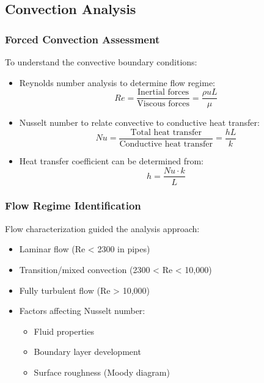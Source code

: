 \subsection*{Convection Analysis}

\subsubsection*{Forced Convection Assessment}

To understand the convective boundary conditions:
\begin{itemize}
    \item Reynolds number analysis to determine flow regime:
    \[
    Re = \frac{\text{Inertial forces}}{\text{Viscous forces}} = \frac{\rho u L}{\mu}
    \]
    \item Nusselt number to relate convective to conductive heat transfer:
    \[
    Nu = \frac{\text{Total heat transfer}}{\text{Conductive heat transfer}} = \frac{h L}{k}
    \]
    \item Heat transfer coefficient can be determined from:
    \[
    h = \frac{Nu \cdot k}{L}
    \]
\end{itemize}

\subsubsection*{Flow Regime Identification}

Flow characterization guided the analysis approach:
\begin{itemize}
    \item Laminar flow (Re < 2300 in pipes)
    \item Transition/mixed convection (2300 < Re < 10,000)
    \item Fully turbulent flow (Re > 10,000)
    \item Factors affecting Nusselt number:
    \begin{itemize}
        \item Fluid properties
        \item Boundary layer development
        \item Surface roughness (Moody diagram)
    \end{itemize}
\end{itemize}

